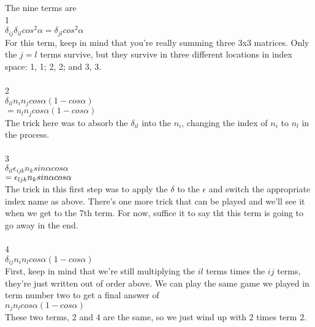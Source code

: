\documentclass[prb,preprint]
{revtex4-1}
\begin{document}
The nine terms are\\
1\\
$\delta_{ij}\delta_{il}cos^2\alpha = \delta_{jl}cos^2\alpha$\\
For this term, keep in mind that you're really summing three 3x3 matrices.  Only the $j=l$ terms survive, but they survive in three different locations in index space: 1, 1; 2, 2; and 3, 3.\\\\
2\\
$\delta_{il}n_in_j cos\alpha\left(1-cos\alpha\right)$\\
$= n_ln_j cos\alpha\left(1 - cos\alpha\right)$\\
The trick here was to absorb the $\delta_{il}$ into the $n_i$, changing the index of $n_i$ to $n_l$ in the process.\\\\
3\\
$\delta_{il}\epsilon_{ijk}n_k sin\alpha cos\alpha$\\
$=\epsilon_{ljk}n_k\space sin\alpha\space cos\alpha$\\
The trick in this first step was to apply the $\delta$ to the $\epsilon$ and switch the appropriate index name as above.  There's one more trick that can be played and we'll see it when we get to the 7th term.  For now, suffice it to say tht this term is going to go away in the end.\\\\
4\\
$\delta_{ij} n_i n_l cos\alpha\left(1 - cos\alpha\right)$\\
First, keep in mind that we're still multiplying the $il$ terms times the $ij$ terms, they're just written out of order above.  We can play the same game we played in term number two to get a final answer of \\
$n_j n_l cos\alpha \left(1 - cos\alpha\right)$\\
These two terms, 2 and 4 are the same, so we just wind up with 2 times term 2.\\\\
\end{document}
